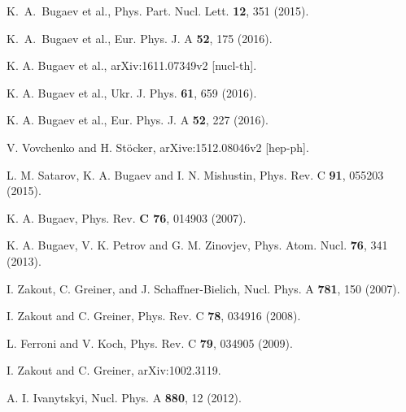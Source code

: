 \documentclass[12pt]{article}
\begin{document}
\begin{thebibliography}{99}
 
  K.~A.~Bugaev et al., 
 Phys. Part. Nucl. Lett. {\bf 12},   351 (2015). 
 
  K.~A.~Bugaev et al., 
 Eur. Phys. J. A  {\bf 52}, 175 (2016). 
  
K. A. Bugaev  et al.,   arXiv:1611.07349v2  [nucl-th].

 K. A. Bugaev et al., 
Ukr. J. Phys.  {\bf 61},  659 (2016).
  
 K. A. Bugaev et al., 
 Eur. Phys. J. A  {\bf 52}, 227 (2016). 
 
%
V. Vovchenko and  H. St{\"o}cker, arXive:1512.08046v2 [hep-ph]. 
  
%
L. M. Satarov, K. A. Bugaev and I. N. Mishustin, 
Phys. Rev. C {\bf 91}, 055203 (2015).

K. A. Bugaev, 
{Phys. Rev.} {\bf C 76},  014903  (2007). 

%
K. A. Bugaev, V. K. Petrov and G. M. Zinovjev,
Phys.  Atom. Nucl.  {\bf 76},  341  (2013).


I. Zakout, C. Greiner, and J. Schaffner-Bielich,  Nucl. Phys. A
{\bf  781}, 150 (2007).

 I. Zakout and C. Greiner, Phys. Rev. C  {\bf  78}, 034916 (2008).
 
L. Ferroni and V. Koch, Phys. Rev. C {\bf  79}, 034905 (2009).
 
I. Zakout and C. Greiner, arXiv:1002.3119.
 

A. I. Ivanytskyi, Nucl. Phys. A {\bf 880}, 12 (2012).



\end{thebibliography}
\end{document}
